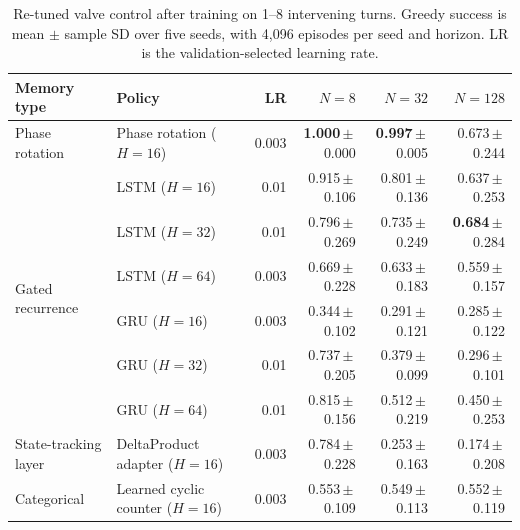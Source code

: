 \begin{table}[!htbp]
\centering\small
\caption{Re-tuned valve control after training on 1--8 intervening turns.
Greedy success is mean $\pm$ sample SD over five seeds, with 4,096
episodes per seed and horizon. LR is the validation-selected learning rate.}
\label{tab:valve}
\setlength{\tabcolsep}{4pt}
\begin{tabular}{@{}llrrrr@{}}
\toprule
Memory type & Policy & LR & $N=8$ & $N=32$ & $N=128$ \\
\midrule
Phase rotation & Phase rotation ($H=16$) & 0.003 & \textbf{1.000}\,$\pm$\,0.000 & \textbf{0.997}\,$\pm$\,0.005 & 0.673\,$\pm$\,0.244 \\
\midrule
\multirow{6}{*}{Gated recurrence} & LSTM ($H=16$) & 0.01 & 0.915\,$\pm$\,0.106 & 0.801\,$\pm$\,0.136 & 0.637\,$\pm$\,0.253 \\
 & LSTM ($H=32$) & 0.01 & 0.796\,$\pm$\,0.269 & 0.735\,$\pm$\,0.249 & \textbf{0.684}\,$\pm$\,0.284 \\
 & LSTM ($H=64$) & 0.003 & 0.669\,$\pm$\,0.228 & 0.633\,$\pm$\,0.183 & 0.559\,$\pm$\,0.157 \\
 & GRU ($H=16$) & 0.003 & 0.344\,$\pm$\,0.102 & 0.291\,$\pm$\,0.121 & 0.285\,$\pm$\,0.122 \\
 & GRU ($H=32$) & 0.01 & 0.737\,$\pm$\,0.205 & 0.379\,$\pm$\,0.099 & 0.296\,$\pm$\,0.101 \\
 & GRU ($H=64$) & 0.01 & 0.815\,$\pm$\,0.156 & 0.512\,$\pm$\,0.219 & 0.450\,$\pm$\,0.253 \\
\midrule
State-tracking layer & DeltaProduct adapter ($H=16$) & 0.003 & 0.784\,$\pm$\,0.228 & 0.253\,$\pm$\,0.163 & 0.174\,$\pm$\,0.208 \\
\midrule
Categorical & Learned cyclic counter ($H=16$) & 0.003 & 0.553\,$\pm$\,0.109 & 0.549\,$\pm$\,0.113 & 0.552\,$\pm$\,0.119 \\
\bottomrule
\end{tabular}
\end{table}
